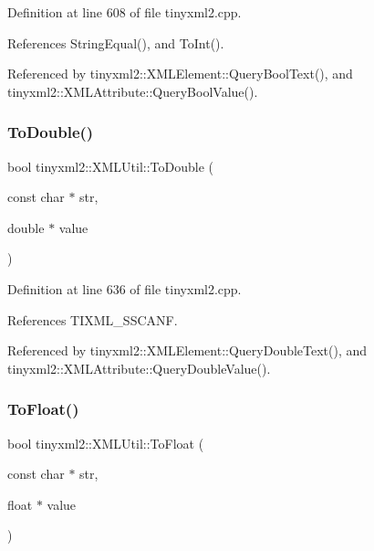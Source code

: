 Definition at line 608 of file tinyxml2.\+cpp.



References String\+Equal(), and To\+Int().



Referenced by tinyxml2\+::\+X\+M\+L\+Element\+::\+Query\+Bool\+Text(), and tinyxml2\+::\+X\+M\+L\+Attribute\+::\+Query\+Bool\+Value().

\mbox{\label{classtinyxml2_1_1_x_m_l_util_ad8f75ac140fb19c1c6e164a957c4cd53}} 
\subsubsection{ToDouble()}
{\footnotesize\ttfamily bool tinyxml2\+::\+X\+M\+L\+Util\+::\+To\+Double (\begin{DoxyParamCaption}\item[{const char $\ast$}]{str,  }\item[{double $\ast$}]{value }\end{DoxyParamCaption})\hspace{0.3cm}{\ttfamily [static]}}



Definition at line 636 of file tinyxml2.\+cpp.



References T\+I\+X\+M\+L\+\_\+\+S\+S\+C\+A\+NF.



Referenced by tinyxml2\+::\+X\+M\+L\+Element\+::\+Query\+Double\+Text(), and tinyxml2\+::\+X\+M\+L\+Attribute\+::\+Query\+Double\+Value().

\mbox{\label{classtinyxml2_1_1_x_m_l_util_a399e71edb5f29d61ea81d91ee0332bb9}} 
\subsubsection{ToFloat()}
{\footnotesize\ttfamily bool tinyxml2\+::\+X\+M\+L\+Util\+::\+To\+Float (\begin{DoxyParamCaption}\item[{const char $\ast$}]{str,  }\item[{float $\ast$}]{value }\end{DoxyParamCaption})\hspace{0.3cm}{\ttfamily [static]}}



